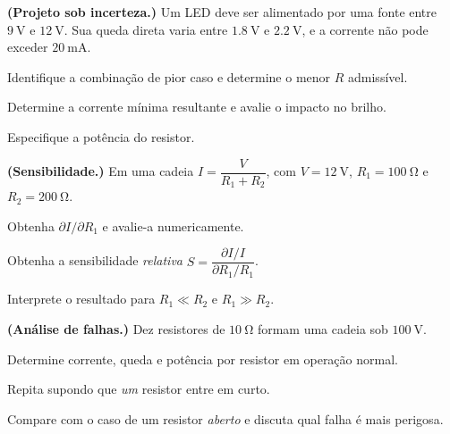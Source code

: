 \begin{questao}[4]{}

\textbf{(Projeto sob incerteza.)} Um LED deve ser alimentado por uma fonte
entre $\SI{9}{\volt}$ e $\SI{12}{\volt}$. Sua queda direta varia entre
$\SI{1.8}{\volt}$ e $\SI{2.2}{\volt}$, e a corrente não pode exceder
$\SI{20}{\milli\ampere}$.
\begin{itensq}
\item Identifique a combinação de pior caso e determine o menor $R$ admissível.
\item Determine a corrente mínima resultante e avalie o impacto no brilho.
\item Especifique a potência do resistor.
\end{itensq}


\end{questao}
\begin{questao}[4]{}

\textbf{(Sensibilidade.)} Em uma cadeia $I=\dfrac{V}{R_1+R_2}$, com
$V=\SI{12}{\volt}$, $R_1=\SI{100}{\ohm}$ e $R_2=\SI{200}{\ohm}$.
\begin{itensq}
\item Obtenha $\partial I/\partial R_1$ e avalie-a numericamente.
\item Obtenha a sensibilidade \emph{relativa}
      $S=\dfrac{\partial I/I}{\partial R_1/R_1}$.
\item Interprete o resultado para $R_1\ll R_2$ e $R_1\gg R_2$.
\end{itensq}


\end{questao}
\begin{questao}[4]{}

\textbf{(Análise de falhas.)} Dez resistores de $\SI{10}{\ohm}$ formam uma
cadeia sob $\SI{100}{\volt}$.
\begin{itensq}
\item Determine corrente, queda e potência por resistor em operação normal.
\item Repita supondo que \emph{um} resistor entre em curto.
\item Compare com o caso de um resistor \emph{aberto} e discuta qual falha é
      mais perigosa.
\end{itensq}


\end{questao}
